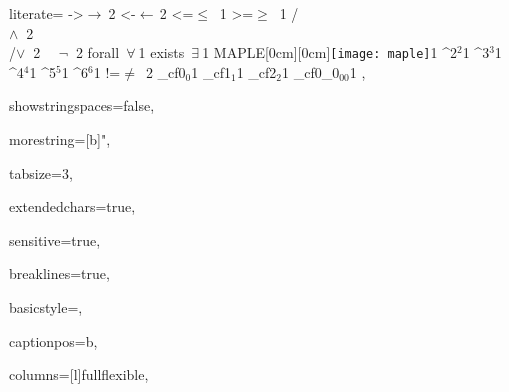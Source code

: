 {%
 literate=
        {->}{{$\rightarrow\ $}}2
	{<-}{{$\leftarrow\,$}}2
        {<=}{{$\leq\;\;$}}1
        {>=}{{$\geq\;\;$}}1
        {/\\}{{$\wedge\;\;$}}2
        {\\/}{{$\vee\;\;$}}2
        {~~}{{$\lnot\;\;$}}2
	{forall\ }{{$\forall\ \!$}}1
	{exists\ }{{$\exists\ \!$}}1
        {MAPLE}{{\raisebox{-0.8cm}[0cm][0cm]{\hspace{18mm}\texttt{[image: maple]}}}}1
	{^2}{{$^2$}}1
	{^3}{{$^3$}}1
	{^4}{{$^4$}}1
	{^5}{{$^5$}}1
	{^6}{{$^6$}}1
        {!=}{{$\neq$}\ }2
        {_cf0}{{$_{{0}}$}}1
        {_cf1}{{$_{{1}}$}}1
        {_cf2}{{$_{{2}}$}}1
        {_cf0_0}{{$_{{00}}$}}1
,


showstringspaces=false,

morestring=[b]",

tabsize=3,

extendedchars=true,

sensitive=true,

breaklines=true,

basicstyle=\ttfamily\footnotesize,

captionpos=b,

columns=[l]fullflexible,

}
